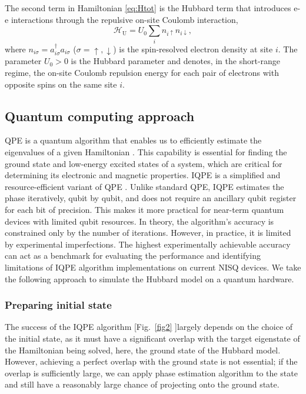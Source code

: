 \documentclass[twocolumn,superscriptaddress,amsmath,amssymb,showpacs,floatfix,preprintnumbers]{revtex4-1}
\newcommand{\s}{\sigma}
\newcommand{\mc}{\mathcal}
\newcommand{\mr}{\mathrm}
\begin{document}
The second term in Hamiltonian \eqref{eq:Htot} is the Hubbard term that introduces 
e-e interactions through the repulsive on-site Coulomb interaction,
%
\begin{equation}  \label{eq:Hub}
	\mc{H}_\mr{U} = U_0 \sum_i n_{i \uparrow} n_{i \downarrow},
\end{equation}
%
where $n_{i \s} = a^\dagger_{i \s} a_{i \s}$ ($\s = \uparrow, \downarrow$) is the 
spin-resolved electron density at site $i$.
%
The parameter $U_0 > 0$ is the Hubbard parameter and denotes, in the short-range
regime, the on-site Coulomb repulsion energy for each pair of electrons with opposite 
spins on the same site $i$. 

\subsection{Quantum computing approach} \label{ss_qu_co_app}
QPE is a quantum algorithm that enables us to efficiently estimate the eigenvalues of a given
Hamiltonian \cite{Whitfield2011,Guzik2005,Wecker2015s}.
%
This capability is essential for finding the ground state and low-energy excited states of a system, 
which are critical for determining its electronic and magnetic properties.
%
IQPE is a simplified and resource-efficient variant of QPE \cite{Dobsicek2007,Parker2000,Whitfield2011}. 
%
Unlike standard QPE, IQPE estimates the phase iteratively, qubit by qubit, and does not require an
ancillary qubit register for each bit of precision.
%
This makes it more practical for near-term quantum devices with limited qubit resources.
%
In theory, the algorithm's accuracy is constrained only by the number of iterations. 
%
However, in practice, it is limited by experimental imperfections. 
%
The highest experimentally achievable accuracy can act as a benchmark for evaluating the performance
and identifying limitations of IQPE algorithm implementations on current NISQ devices.
%
We take the following approach to simulate the Hubbard model on a quantum hardware.
%

\subsubsection{Preparing initial state} \label{sss_init_stat}
The success of the IQPE algorithm [Fig.~\ref{fig2} ]largely depends on the choice of the initial state, 
as it must have a significant overlap with the target eigenstate of the Hamiltonian 
being solved, here, the ground state of the Hubbard model.
%
However, achieving a perfect overlap with the ground state is not essential; 
if the overlap is sufficiently large, we can apply phase estimation algorithm to 
the state and still have a reasonably large chance of projecting onto the ground state.
% 
\end{document}

